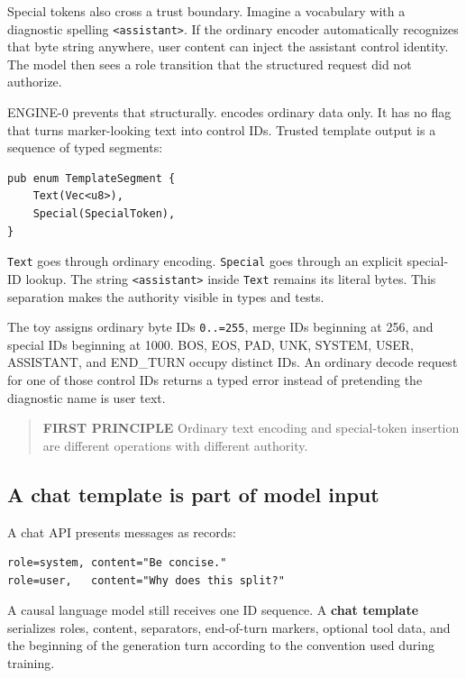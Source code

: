 \documentclass[
  10pt,
]{article}
\begin{document}
Special tokens also cross a trust boundary. Imagine a vocabulary with a
diagnostic spelling
\texttt{\textless{}\textbar{}assistant\textbar{}\textgreater{}}. If the
ordinary encoder automatically recognizes that byte string anywhere,
user content can inject the assistant control identity. The model then
sees a role transition that the structured request did not authorize.

ENGINE-0 prevents that structurally.
\texttt{} encodes ordinary data
only. It has no flag that turns marker-looking text into control IDs.
Trusted template output is a sequence of typed segments:

\begin{verbatim}
pub enum TemplateSegment {
    Text(Vec<u8>),
    Special(SpecialToken),
}
\end{verbatim}

\texttt{Text} goes through ordinary encoding. \texttt{Special} goes
through an explicit special-ID lookup. The string
\texttt{\textless{}\textbar{}assistant\textbar{}\textgreater{}} inside
\texttt{Text} remains its literal bytes. This separation makes the
authority visible in types and tests.

The toy assigns ordinary byte IDs \texttt{0..=255}, merge IDs beginning
at 256, and special IDs beginning at 1000. BOS, EOS, PAD, UNK, SYSTEM,
USER, ASSISTANT, and END\_TURN occupy distinct IDs. An ordinary decode
request for one of those control IDs returns a typed error instead of
pretending the diagnostic name is user text.

\begin{quote}
\textbf{FIRST PRINCIPLE} Ordinary text encoding and special-token
insertion are different operations with different authority.
\end{quote}

\subsection{A chat template is part of model
input}\label{a-chat-template-is-part-of-model-input}

A chat API presents messages as records:

\begin{verbatim}
role=system, content="Be concise."
role=user,   content="Why does this split?"
\end{verbatim}

A causal language model still receives one ID sequence. A \textbf{chat
template} serializes roles, content, separators, end-of-turn markers,
optional tool data, and the beginning of the generation turn according
to the convention used during training.
\end{document}
